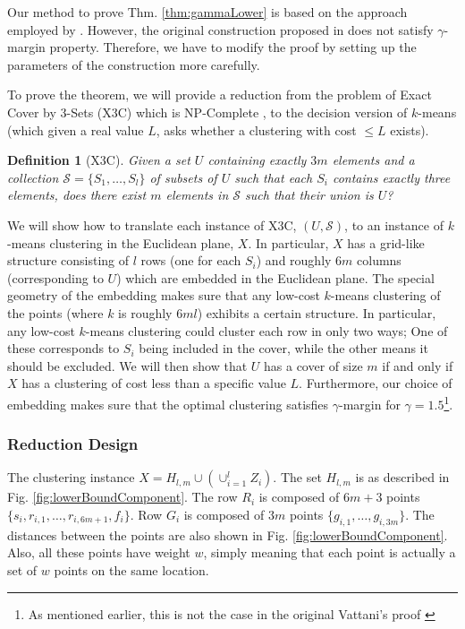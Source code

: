\documentclass{article}
\newcommand{\mc}{\mathcal}
\newtheorem{definition}[theorem]{Definition}
\begin{document}
Our method to prove Thm. \ref{thm:gammaLower} is based on the approach employed by \cite{vattani2009hardness}. However, the original construction proposed in \cite{vattani2009hardness} does not satisfy $\gamma$-margin property. Therefore, we have to modify the proof by setting up the parameters of the construction more carefully. 

To prove the theorem, we will provide a reduction from the problem of Exact Cover by 3-Sets (X3C) which is NP-Complete \cite{garey2002computers}, to the decision version of $k$-means (which given a real value $L$, asks whether a clustering with cost $\le L$ exists).

\begin{definition}[X3C]
Given a set $U$ containing exactly $3m$ elements and a collection $\mc S = \{S_1, \ldots, S_l\}$ of subsets of $U$ such that each $S_i$ contains exactly three elements, does there exist $m$ elements in $\mc S$ such that their union is $U$? 
\end{definition}

We will show how to translate each instance of X3C, $(U,\mc S)$, to an instance of $k$-means clustering in the Euclidean plane, $X$. In particular, $X$ has a grid-like structure consisting of $l$ rows (one for each $S_i$) and roughly $6m$ columns (corresponding to $U$) which are embedded in the Euclidean plane. The special geometry of the embedding makes sure that any low-cost $k$-means clustering of the points (where $k$ is roughly $6ml$) exhibits a certain structure. In particular, any low-cost $k$-means clustering could cluster each row in only two ways; One of these corresponds to $S_i$ being included in the cover, while the other means it should be excluded. We will then show that $U$ has a cover of size $m$ if and only if $X$ has a clustering of cost less than a specific value $L$. Furthermore, our choice of embedding makes sure that the optimal clustering satisfies $\gamma$-margin for $\gamma=1.5$\footnote{As mentioned earlier, this is not the case in the original Vattani's proof \cite{vattani2009hardness}}.


\subsubsection{Reduction Design}
The clustering instance $X = H_{l,m} \cup (\cup_{i=1}^l Z_i)$. The set $H_{l,m}$ is as described in Fig. \ref{fig:lowerBoundComponent}. The row $R_i$ is composed of $6m + 3$ points $\{s_i, r_{i, 1}, \ldots, r_{i, 6m+1}, f_i\}$. Row $G_i$ is composed of $3m$ points $\{g_{i,1}, \ldots, g_{i, 3m}\}$. The distances between the points are also shown in Fig. \ref{fig:lowerBoundComponent}. Also, all these points have weight $w$, simply meaning that each point is actually a set of $w$ points on the same location.
\end{document}
